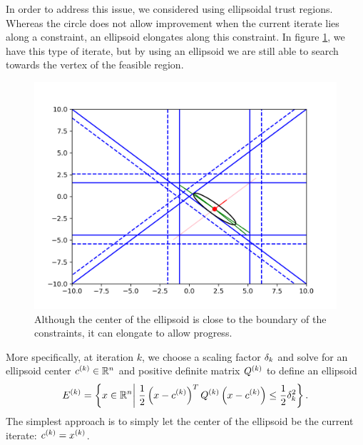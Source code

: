 In order to address this issue, we considered using ellipsoidal trust regions.
Whereas the circle does not allow improvement when the current iterate lies along a constraint, an ellipsoid elongates along this constraint.
In figure \cref{ellipse_adv}, we have this type of iterate, but by using an ellipsoid we are still able to search towards the vertex of the feasible region.
\begin{figure}[ht]
    \centering
    \includegraphics[scale=0.4]{images/advantage_of_ellipse_2.png}
    \caption[An ellipsoidal trust region allows for more progress than a circular trust region.] {
    	Although the center of the ellipsoid is close to the boundary of the constraints, it can elongate to allow progress.
    }
    \label{ellipse_adv}
\end{figure}



More specifically, at iteration $k$, we choose a scaling factor $\delta_k$ and solve for an ellipsoid center $c^{(k)} \in \mathbb R^n$ and positive definite matrix ${Q^{(k)}}$ to define an ellipsoid
\begin{align*}
{E^{(k)}} = \left\{x \in \mathbb R^n \bigg| \; \frac 1 2 \left(x - c^{(k)}\right)^T{Q^{(k)}}\left(x - c^{(k)}\right) \le \frac 1 2 \delta_k^2 \right\}.
\end{align*}
The simplest approach is to simply let the center of the ellipsoid be the current iterate: $c^{(k)} = x^{(k)}$.





